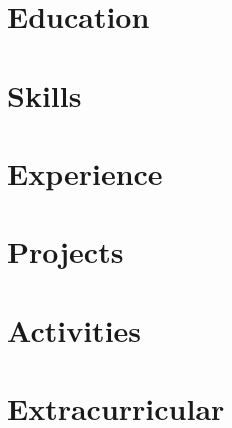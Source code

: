 \documentclass[letter,10pt]{article}
\begin{document}


\section{Education}


\section{Skills}


\section{Experience}


\newpage
\pagestyle{empty}
\setlength{\voffset}{-0.75in}
\setlength{\headsep}{5pt}

\section{Projects}


\section{Activities}


\section{Extracurricular}

\end{document}
